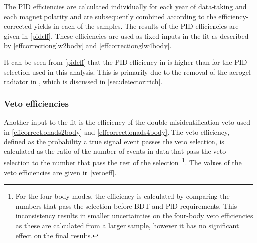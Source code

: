 The PID efficiencies are calculated individually for each year of data-taking and each magnet polarity and are subsequently combined according to the efficiency-corrected yields in each of the samples. The results of the PID efficiencies are given in \tab\ref{pideff}. These efficiencies are used as fixed inputs in the \CP fit as described by \eqns\ref{effcorrectionglw2body} and \ref{effcorrectionglw4body}. 

\begin{table}[h]
\centering
{}
\caption{Summary of the PID efficiencies used in the \CP fit.}
\label{pideff}
\end{table}

It can be seen from \tab\ref{pideff} that the PID efficiency in \runtwo is higher than \runone for the PID selection used in this analysis. This is primarily due to the removal of the aerogel radiator in \runtwo, which is discussed in \sect\ref{sec:detector:rich}. 

\subsubsection{Veto efficiencies}
\label{sec:cpfit:efficiencies:veto}

Another input to the fit is the efficiency of the double misidentification veto used in \eqns\ref{effcorrectionads2body} and \ref{effcorrectionads4body}. The veto efficiency, defined as the probability a true signal event passes the veto selection, is calculated as the ratio of the number of events in data that pass the veto selection to the number that pass the rest of the selection~\footnote{For the four-body modes, the efficiency is calculated by comparing the numbers that pass the selection before BDT and PID requirements. This inconsistency results in smaller uncertainties on the four-body veto efficiencies as these are calculated from a larger sample, however it has no significant effect on the final results.}. The values of the veto efficiencies are given in \tab\ref{vetoeff}.

